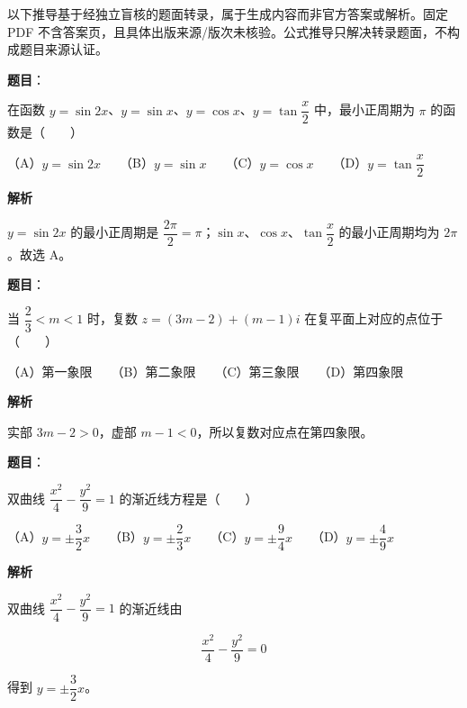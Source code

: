 

\begin{gktip}
以下推导基于经独立盲核的题面转录，属于生成内容而非官方答案或解析。固定 PDF 不含答案页，且具体出版来源/版次未核验。公式推导只解决转录题面，不构成题目来源认证。
\end{gktip}

\begin{answer}

\textbf{题目}：

在函数 $y=\sin 2x$、$y=\sin x$、$y=\cos x$、$y=\tan\dfrac{x}{2}$ 中，最小正周期为 $\pi$ 的函数是\mbox{（　　）}

（A）$y=\sin 2x$　　（B）$y=\sin x$　　（C）$y=\cos x$　　（D）$y=\tan\dfrac{x}{2}$

\textbf{解析}

$y=\sin 2x$ 的最小正周期是 $\dfrac{2\pi}{2}=\pi$；$\sin x$、$\cos x$、$\tan\dfrac{x}{2}$ 的最小正周期均为 $2\pi$。故选 A。


\end{answer}
\begin{answer}

\textbf{题目}：

当 $\dfrac{2}{3}<m<1$ 时，复数 $z=(3m-2)+(m-1)i$ 在复平面上对应的点位于\mbox{（　　）}

（A）第一象限　　（B）第二象限　　（C）第三象限　　（D）第四象限

\textbf{解析}

实部 $3m-2>0$，虚部 $m-1<0$，所以复数对应点在第四象限。


\end{answer}
\begin{answer}

\textbf{题目}：

双曲线 $\dfrac{x^2}{4}-\dfrac{y^2}{9}=1$ 的渐近线方程是\mbox{（　　）}

（A）$y=\pm\dfrac{3}{2}x$　　（B）$y=\pm\dfrac{2}{3}x$　　（C）$y=\pm\dfrac{9}{4}x$　　（D）$y=\pm\dfrac{4}{9}x$

\textbf{解析}

双曲线 $\dfrac{x^2}{4}-\dfrac{y^2}{9}=1$ 的渐近线由

\nopagebreak[4]
\[
\frac{x^2}{4}-\frac{y^2}{9}=0
\]

得到 $y=\pm\dfrac32x$。


\end{answer}
